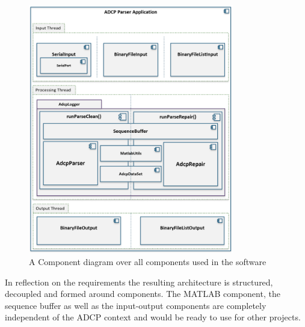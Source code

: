 \begin{figure}[h]
\centering
      \includegraphics[width=0.8\textwidth]{all_components}
        \caption{A Component diagram over all components used in the software}
\end{figure}
In reflection on the requirements the resulting architecture is structured, decoupled and formed around components. The MATLAB component, the sequence buffer as well as the input-output components are completely independent of the ADCP context and would be ready to use for other projects.

